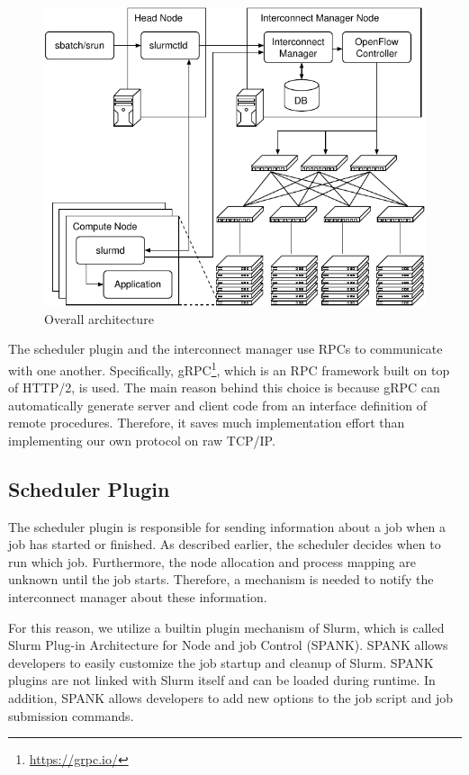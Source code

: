 \documentclass[graybox]{svmult}
\begin{document}
\begin{figure}
    \centering
    \includegraphics{architecture}
    \caption{Overall architecture}%
    \label{kt:fig:architecture}
\end{figure}

The scheduler plugin and the interconnect manager use RPCs to communicate with
one another. Specifically, gRPC\footnote{\url{https://grpc.io/}}, which is an
RPC framework built on top of HTTP/2, is used. The main reason behind this
choice is because gRPC can automatically generate server and client code from
an interface definition of remote procedures. Therefore, it saves much
implementation effort than implementing our own protocol on raw TCP/IP\@.

\subsection{Scheduler Plugin}

The scheduler plugin is responsible for sending information about a job when a
job has started or finished. As described earlier, the scheduler decides when
to run which job. Furthermore, the node allocation and process mapping are
unknown until the job starts. Therefore, a mechanism is needed to notify the
interconnect manager about these information.

For this reason, we utilize a builtin plugin mechanism of Slurm, which is
called Slurm Plug-in Architecture for Node and job Control (SPANK). SPANK
allows developers to easily customize the job startup and cleanup of Slurm.
SPANK plugins are not linked with Slurm itself and can be loaded during
runtime. In addition, SPANK allows developers to add new options to the job
script and job submission commands.
\end{document}
